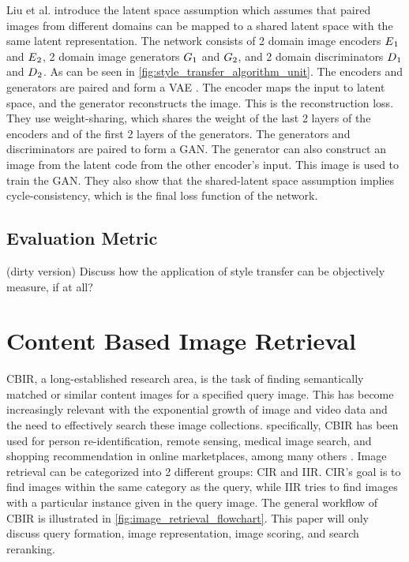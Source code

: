 Liu et al. \cite{Liu2017} introduce the latent space assumption which assumes that paired images from different domains can be mapped to a shared latent space with the same latent representation.
The network consists of 2 domain image encoders $E\textsubscript{$1$}$ and $E\textsubscript{$2$}$, 2 domain image generators $G\textsubscript{$1$}$ and $G\textsubscript{$2$}$, and 2 domain discriminators $D\textsubscript{$1$}$ and $D\textsubscript{$2$}$.
As can be seen in \ref{fig:style_transfer_algorithm_unit}.
The encoders and generators are paired and form a \gls{VAE} \cite{kingma2022}.
The encoder maps the input to latent space, and the generator reconstructs the image.
This is the reconstruction loss.
They use weight-sharing, which shares the weight of the last 2 layers of the encoders and of the first 2 layers of the generators.
The generators and discriminators are paired to form a \gls{GAN}.
The generator can also construct an image from the latent code from the other encoder's input.
This image is used to train the \gls{GAN}.
They also show that the shared-latent space assumption implies cycle-consistency, which is the final loss function of the network.

\subsection{Evaluation Metric}
(dirty version)
Discuss how the application of style transfer can be objectively measure, if at all?

\section{Content Based Image Retrieval}
\gls{CBIR}, a long-established research area, is the task of finding semantically matched or similar content images for a specified query image.
This has become increasingly relevant with the exponential growth of image and video data and the need to effectively search these image collections.
specifically, \gls{CBIR} has been used for person re-identification, remote sensing, medical image search, and shopping recommendation in online marketplaces, among many others \cite{Chen2021}.
Image retrieval can be categorized into 2 different groups: \gls{CIR} and \gls{IIR}.
\gls{CIR}'s goal is to find images within the same category as the query, while \gls{IIR} tries to find images with a particular instance given in the query image.
The general workflow of \gls{CBIR} is illustrated in \ref{fig:image_retrieval_flowchart}.
This paper will only discuss query formation, image representation, image scoring, and search reranking.


